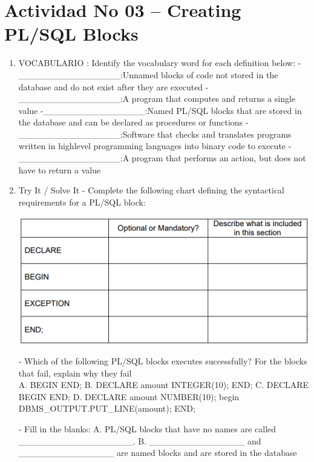 \section{Actividad No 03 –  Creating PL/SQL Blocks} 
		
\begin{enumerate}[1.]
	\item VOCABULARIO :
	\subitem Identify the vocabulary word for each definition below:
	\subitem-\_\_\_\_\_\_\_\_\_\_\_\_\_\_\_\_:Unnamed blocks of code not stored in the database and do not exist after they are executed
	\subitem-\_\_\_\_\_\_\_\_\_\_\_\_\_\_\_\_:A program that computes and returns a single value
	\subitem-\_\_\_\_\_\_\_\_\_\_\_\_\_\_\_\_:Named PL/SQL blocks that are stored in the database and can be declared as procedures or functions
	\subitem-\_\_\_\_\_\_\_\_\_\_\_\_\_\_\_\_:Software that checks and translates programs written in highlevel programming languages into binary code to execute
	\subitem-\_\_\_\_\_\_\_\_\_\_\_\_\_\_\_\_:A program that performs an action, but does not have to return a value

	\item Try It / Solve It
	- Complete the following chart defining the syntactical requirements for a PL/SQL block:

	\begin{center}
	\includegraphics[width=15cm]{./Imagenes/actividad01}  
	\end{center}	
	- Which of the following PL/SQL blocks executes successfully? For the blocks that fail, explain why they fail
	\\
	\subitem A. BEGIN
	\subitem    END;
	\subitem B. DECLARE
 	\subitem    amount INTEGER(10);
	\subitem    END;
	\subitem C. DECLARE
	 \subitem   BEGIN
	 \subitem   END;
	\subitem D. DECLARE
	 \subitem	amount NUMBER(10);
	 \subitem	begin
	 \subitem	DBMS\_OUTPUT.PUT\_LINE(amount);
	 \subitem	END;
	
	- Fill in the blanks:
	\subitem A. PL/SQL blocks that have no names are called \_\_\_\_\_\_\_\_\_\_\_\_\_\_\_\_\_\_.
	\subitem B. \_\_\_\_\_\_\_\_\_\_\_\_\_\_\_ and \_\_\_\_\_\_\_\_\_\_\_\_\_\_\_ are named blocks and are stored in the database

	

\end{enumerate}

